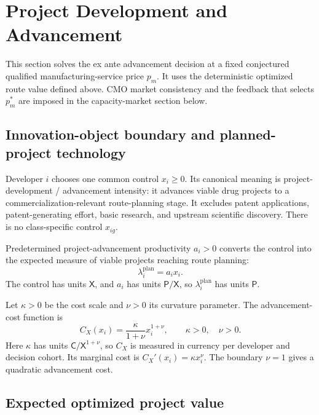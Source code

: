 \section{Project Development and Advancement}
\label{sec:p05-project-advancement}

This section solves the ex ante advancement decision at a fixed conjectured
qualified manufacturing-service price \(p_m\). It uses the deterministic
optimized route value defined above. CMO market consistency and the feedback
that selects \(p_m^*\) are imposed in the capacity-market section below.

\subsection{Innovation-object boundary and planned-project technology}
\label{subsec:p05-technology}

Developer \(i\) chooses one common control \(x_i\geq0\). Its canonical meaning
is project-development / advancement intensity: it advances viable drug
projects to a commercialization-relevant route-planning stage. It excludes
patent applications, patent-generating effort, basic research, and upstream
scientific discovery. There is no class-specific control \(x_{ig}\).

Predetermined project-advancement productivity \(a_i>0\) converts the control
into the expected measure of viable projects reaching route planning:
\begin{equation}
  \lambda_i^{\mathrm{plan}}=a_ix_i.
  \label{eq:p05-planned-intensity}
\end{equation}
The control has units \(\mathsf X\), and \(a_i\) has units
\(\mathsf P/\mathsf X\), so
\(\lambda_i^{\mathrm{plan}}\) has units \(\mathsf P\).

Let \(\kappa>0\) be the cost scale and \(\nu>0\) its curvature
parameter. The advancement-cost function is
\begin{equation}
  C_X(x_i)
  =
  \frac{\kappa}{1+\nu}x_i^{1+\nu},
  \qquad
  \kappa>0,\quad \nu>0.
  \label{eq:p05-advancement-cost}
\end{equation}
Here \(\kappa\) has units
\(\mathsf C/\mathsf X^{1+\nu}\), so \(C_X\) is measured in currency
per developer and decision cohort. Its marginal cost is
\(C_X'(x_i)=\kappa x_i^\nu\). The boundary \(\nu=1\) gives a quadratic
advancement cost.

\subsection{Expected optimized project value}
\label{subsec:p05-expected-value}

